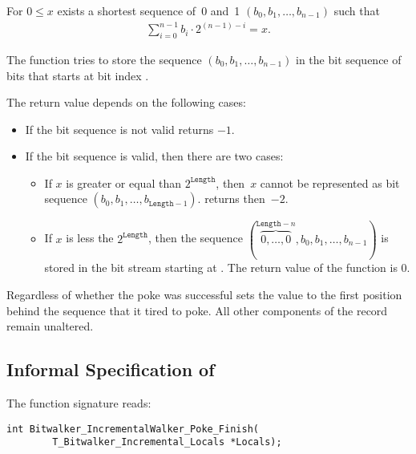For $0 \leq x$ exists a shortest sequence of~0 and~1
$(b_0, b_1,\ldots,b_{n - 1})$
such that
\begin{align}
    \sum_{i=0}^{n-1} b_i \cdot 2^{(n - 1) - i} = x.
\end{align}

The function \pokenext tries to store the sequence $(b_0, b_1,\ldots,b_{n - 1})$
in the bit sequence of  bits that starts
at bit index .

The return value depends on  the following cases:
\begin{itemize}
    \item  If the bit sequence is not valid \peeknext  returns $-1$.
    \item  If the bit sequence is valid, then there are two cases:
\begin{itemize}
\item
If $x$ is greater or equal than $2^\mathtt{Length}$, then~$x$
cannot be represented as bit sequence $(b_0, b_1,\ldots,b_{\mathtt{Length} - 1})$.
\pokenext returns then~$-2$.

\item
If $x$ is less the $2^{\mathtt{Length}}$, then  the sequence
$(\overbrace{0,\ldots,0}^{\mathtt{Length}-n},b_0, b_1,\ldots,b_{n - 1})$
is stored in the bit stream starting at .
The return value of the function \pokenext is 0.

\end{itemize}
\end{itemize}

Regardless of whether the poke was successful \pokenext sets the value   to the first position behind the sequence that it tired to poke.
 All other components of the record  remain unaltered.



\clearpage

\subsection{Informal Specification of }

 The function signature reads:\\[1em]

\begin{lstlisting}[style=acsl-block]
int Bitwalker_IncrementalWalker_Poke_Finish(
        T_Bitwalker_Incremental_Locals *Locals);
\end{lstlisting}

